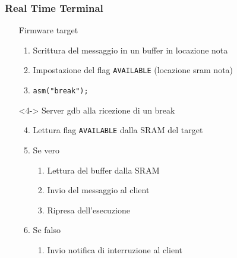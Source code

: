 \documentclass[aspectratio=169,
]{beamer}
\begin{document}
    \begin{frame}
        \frametitle{Real Time Terminal}
        \hspace*{-10mm}\begin{minipage}{.7\textwidth}
            \begin{itemize}
                \item[] Firmware target
                \begin{enumerate}
                    \item <1-> Scrittura del messaggio in un buffer in locazione nota
                    \item <2-> Impostazione del flag \texttt{AVAILABLE} (locazione sram nota)
                    \item <3-> \texttt{asm("break");}
                \end{enumerate}
                \item[] <4-> Server gdb alla ricezione di un break
                \begin{enumerate}
                    \setcounter{enumi}{3}
                    \item <4-> Lettura flag \texttt{AVAILABLE} dalla SRAM del target
                    \item <5-> Se vero
                    \begin{enumerate}
                        \item <5-> Lettura del buffer dalla SRAM
                        \item <5-> Invio del messaggio al client
                        \item <5-> Ripresa dell'esecuzione
                    \end{enumerate}
                    \item <6-> Se falso
                    \begin{enumerate}
                        \item <6-> Invio notifica di interruzione al client
                    \end{enumerate}
                \end{enumerate}
            \end{itemize}     
        \end{minipage}
        \begin{minipage}{.28\textwidth}
            \begin{figure}
                \begin{tikzpicture}[scale=.8, label distance=-2mm]


\end{tikzpicture}
\end{figure}
\end{minipage}
\end{frame}
\end{document}
